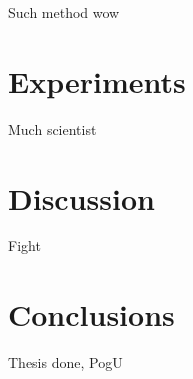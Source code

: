 \documentclass[sigconf]{acmart}
\begin{document}
Such method wow

\section{Experiments}
\label{sec:Experiments}

Much scientist

\section{Discussion}
\label{sec:Discussion}

Fight

\section{Conclusions}
\label{sec:Conclusions}
\cite{ApacheFlink}
Thesis done, PogU

%


\end{document}
